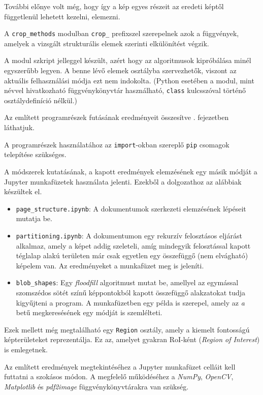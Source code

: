 További előnye volt még, hogy így a kép egyes részeit az eredeti képtől függetlenül lehetett kezelni, elemezni.

A \texttt{crop\_methods} modulban \texttt{crop\_} prefixszel szerepelnek azok a függvények, amelyek a vizsgált strukturális elemek szerinti elkülönítést végzik.

A modul szkript jelleggel készült, azért hogy az algoritmusok kipróbálása minél egyszerűbb legyen.
A benne lévő elemek osztályba szervezhetők, viszont az aktuális felhasználási módja ezt nem indokolta. (Python esetében a modul, mint névvel hivatkozható függvénykönyvtár használható, \texttt{class} kulcsszóval történő osztálydefiníció nélkül.)

Az említett programrészek futásának eredményeit összesítve . fejezetben láthatjuk.

A programrészek használatához az \texttt{import}-okban szereplő \texttt{pip} csomagok telepítése szükséges.


A módszerek kutatásának, a kapott eredmények elemzésének egy másik módját a Jupyter munkafüzetek használata jelenti.
Ezekből a dolgozathoz az alábbiak készültek el.
\begin{itemize}
\item \texttt{page\_structure.ipynb}: A dokumentumok szerkezeti elemzésének lépéseit mutatja be.
\item \texttt{partitioning.ipynb}: A dokumentumon egy rekurzív felosztásos eljárást alkalmaz, amely a képet addig szeleteli, amíg mindegyik felosztással kapott téglalap alakú területen már csak egyetlen egy összefüggő (nem elvágható) képelem van. Az eredményeket a munkafüzet meg is jeleníti.
\item \texttt{blob\_shapes}: Egy \textit{floodfill} algoritmust mutat be, amellyel az egymással szomszédos sötét színű képpontokból kapott összefüggő alakzatokat tudja kigyűjteni a program. A munkafüzetben egy példa is szerepel, amely az \emph{a} betű megkeresésének egy módját is szemlélteti.
\end{itemize}

Ezek mellett még megtalálható egy \texttt{Region} osztály, amely a kiemelt fontosságú képterületeket reprezentálja. Ez az, amelyet gyakran RoI-ként (\textit{Region of Interest}) is emlegetnek.

Az említett eredmények megtekintéséhez a Jupyter munkafüzet celláit kell futtatni a szokásos módon. A megfelelő működéséhez a \textit{NumPy}, \textit{OpenCV}, \textit{Matplotlib} és \textit{pdf2image} függvénykönyvtárakra van szükség.
